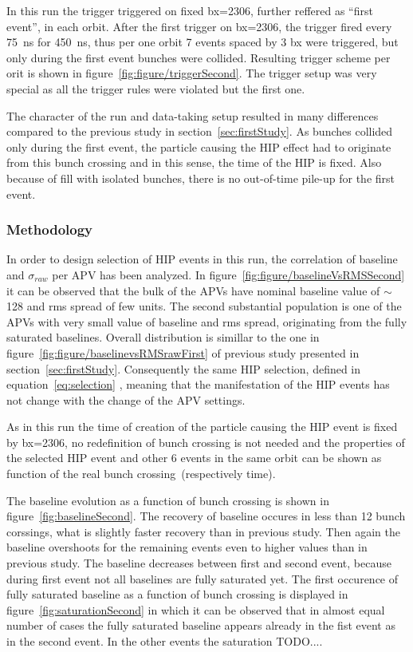 In this run the trigger triggered on fixed bx=2306, further reffered as ``first event'', in each orbit. After the first trigger on bx=2306, the trigger fired every 75~ns for 450~ns, thus per one orbit 7 events spaced by 3 bx were triggered, but only during the first event bunches were collided. Resulting trigger scheme per orit is shown in figure~\ref{fig:figure/triggerSecond}. The trigger setup was very special as  all the trigger rules were violated but the first one.


The character of the run and data-taking setup resulted in many differences compared to the previous study in section~\ref{sec:firstStudy}. As bunches collided only during the first event, the particle causing the HIP effect had to originate from this bunch crossing and in this sense, the time of the HIP is fixed. Also because of fill with isolated bunches, there is no out-of-time pile-up for the first event.

\subsubsection{Methodology}

In order to design selection of HIP events in this run, the correlation of baseline and $\sigma_{raw}$ per APV has been analyzed. In figure~\ref{fig:figure/baselineVsRMSSecond} it can be observed that the bulk of the APVs have nominal baseline value of $\sim$128 and rms spread of few units. The second substantial population is one of the APVs with very small value of baseline and rms spread, originating from the fully saturated baselines. Overall distribution is simillar to the one in figure~\ref{fig:figure/baselinevsRMSrawFirst} of previous study presented in section~\ref{sec:firstStudy}. Consequently the same HIP selection, defined in equation~\ref{eq:selection} , meaning that the manifestation of the HIP events has not change with the change of the APV settings.


As in this run the time of creation of the particle causing the HIP event is fixed by bx=2306, no redefinition of bunch crossing is not needed and the properties of the selected HIP event and other 6 events in the same orbit can be shown as function of the real bunch crossing~(respectively time).

The baseline evolution as a function of bunch crossing is shown in figure~\ref{fig:baselineSecond}. The recovery of baseline occures in less than 12 bunch corssings, what is slightly faster recovery than in previous study. Then again the baseline overshoots for the remaining events even to higher values than in previous study. The baseline decreases between first and second event, because during first event not all baselines are fully saturated yet. The first occurence of fully saturated baseline as a function of bunch crossing is displayed in figure~\ref{fig:saturationSecond} in which it can be observed that in almost equal number of cases the fully saturated baseline appears already in the fist event as in the second event. In the other events the saturation TODO....

